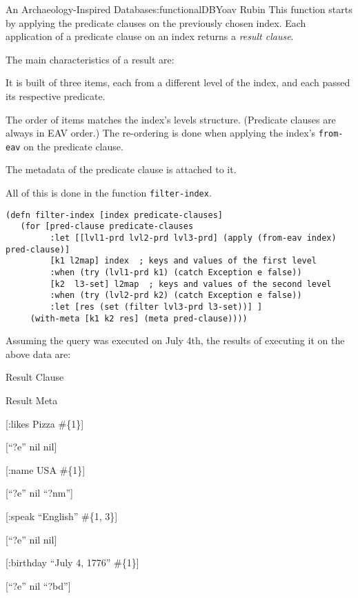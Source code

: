 \begin{aosachapter}{An Archaeology-Inspired Database}{s:functionalDB}{Yoav Rubin}
This function starts by applying the predicate clauses on the previously
chosen index. Each application of a predicate clause on an index returns
a \emph{result clause}.

The main characteristics of a result are:

\begin{aosaenumerate}
\def\labelenumi{\arabic{enumi}.}

\item
  It is built of three items, each from a different level of the index,
  and each passed its respective predicate.
\item
  The order of items matches the index's levels structure. (Predicate
  clauses are always in EAV order.) The re-ordering is done when
  applying the index's \texttt{from-eav} on the predicate clause.
\item
  The metadata of the predicate clause is attached to it.
\end{aosaenumerate}

All of this is done in the function \texttt{filter-index}.

\begin{verbatim}
(defn filter-index [index predicate-clauses]
   (for [pred-clause predicate-clauses
         :let [[lvl1-prd lvl2-prd lvl3-prd] (apply (from-eav index) pred-clause)] 
         [k1 l2map] index  ; keys and values of the first level
         :when (try (lvl1-prd k1) (catch Exception e false))  
         [k2  l3-set] l2map  ; keys and values of the second level
         :when (try (lvl2-prd k2) (catch Exception e false))
         :let [res (set (filter lvl3-prd l3-set))] ]
     (with-meta [k1 k2 res] (meta pred-clause))))
\end{verbatim}

Assuming the query was executed on July 4th, the results of executing it
on the above data are:

Result Clause

Result Meta

{[}:likes Pizza \#\{1\}{]}

{[}``?e'' nil nil{]}

{[}:name USA \#\{1\}{]}

{[}``?e'' nil ``?nm''{]}

{[}:speak ``English'' \#\{1, 3\}{]}

{[}``?e'' nil nil{]}

{[}:birthday ``July 4, 1776'' \#\{1\}{]}

{[}``?e'' nil ``?bd''{]}


\end{aosachapter}
